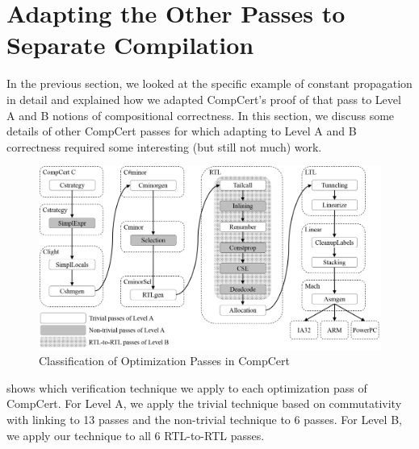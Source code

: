 \section{Adapting the Other Passes to Separate Compilation}

In the previous section, we looked at the specific example of constant propagation in detail and
explained how we adapted CompCert's proof of that pass to Level A and B notions of compositional
correctness.  In this section, we discuss some details of other CompCert passes for which adapting
to Level A and B correctness required some interesting (but still not much) work.

\begin{figure}[t]
\includegraphics[width=\textwidth]{sepcomp-passes.png}
\caption{Classification of Optimization Passes in CompCert}
\label{fig:sep-comp-passes}
\end{figure}

 shows which verification technique we apply to each optimization
pass of CompCert.  For Level A, we apply the trivial technique based on commutativity with linking
to 13 passes and the non-trivial technique to 6 passes.  For Level B, we apply our technique to all
6 RTL-to-RTL passes.



